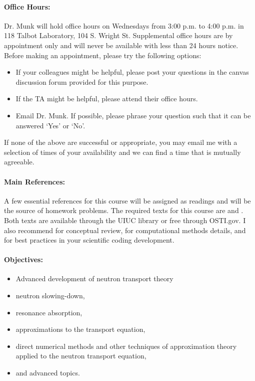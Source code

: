 \documentclass[11pt, a4paper]{article}
\newcommand{\MunkOfficeHourDays}{Wednesdays\xspace}%
\newcommand{\MunkOfficeHourStart}{3:00 p.m.\xspace}%
\newcommand{\MunkOfficeHourEnd}{4:00 p.m.\xspace}%
\newcommand{\MunkOfficeHourPlace}{118 Talbot Laboratory, 104 S. Wright St.\xspace}
\begin{document}
\paragraph{Office Hours:} Dr. Munk  will hold office hours on
\MunkOfficeHourDays from \MunkOfficeHourStart to \MunkOfficeHourEnd in
\MunkOfficeHourPlace Supplemental office hours are by appointment only
and will never be available with less than 24 hours notice.
Before making an appointment, please try the following options:
\begin{itemize}
\item If your colleagues might be helpful, please post your questions in the
        canvas discussion forum provided for this purpose.
\item If the TA might be helpful, please attend their office hours.
\item Email Dr. Munk. If possible, please phrase your question such that it
        can be answered `Yes' or `No'.
\end{itemize}

If none of the above are successful or appropriate, you may email me with a
selection of times of your availability and we can find a time that is mutually
agreeable.

\paragraph{Main References:}
A few essential references for this course will be assigned as readings and
will be the source of homework problems. The required texts for this course are
\cite{stacey} and \cite{bell_glasstone}. Both texts are available
through the UIUC library or free through OSTI.gov. I also recommend
\cite{duderstadt_hamilton} for conceptual review,
\cite{lewis_miller} for computational methods details, and \cite{scopatz_huff}
for best practices in your scientific coding development.


\renewcommand{\refname}{\normalfont\selectfont\normalsize}\vspace{-1cm}


\paragraph{Objectives:}
\begin{itemize}
\item Advanced development of neutron transport theory
\item  neutron slowing-down,
\item resonance absorption,
\item  approximations to the transport equation,
\item  direct numerical methods and other techniques of approximation theory
        applied to the neutron transport equation,
\item  and advanced topics.
\end{itemize}
\end{document}
